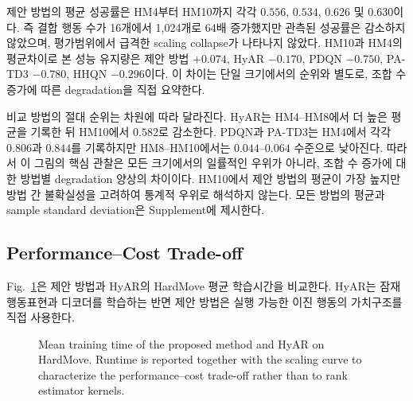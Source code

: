 \documentclass[10pt,journal]{IEEEtran}
\begin{document}
제안 방법의 평균 성공률은 HM4부터 HM10까지 각각
$0.556$, $0.534$, $0.626$ 및 $0.630$이다. 즉 결합 행동 수가 16개에서 1,024개로 64배 증가했지만 관측된 성공률은 감소하지 않았으며, 평가범위에서 급격한 scaling collapse가 나타나지 않았다. HM10과 HM4의 평균차이로 본 성능 유지량은 제안 방법 $+0.074$, HyAR $-0.170$, PDQN $-0.750$, PA-TD3 $-0.780$, HHQN $-0.296$이다. 이 차이는 단일 크기에서의 순위와 별도로, 조합 수 증가에 따른 degradation을 직접 요약한다.

비교 방법의 절대 순위는 차원에 따라 달라진다. HyAR는 HM4--HM8에서 더 높은 평균을 기록한 뒤 HM10에서 $0.582$로 감소한다. PDQN과 PA-TD3는 HM4에서 각각 $0.806$과 $0.844$를 기록하지만 HM8--HM10에서는 $0.044$--$0.064$ 수준으로 낮아진다. 따라서 이 그림의 핵심 관찰은 모든 크기에서의 일률적인 우위가 아니라, 조합 수 증가에 대한 방법별 degradation 양상의 차이이다. HM10에서 제안 방법의 평균이 가장 높지만 방법 간 불확실성을 고려하여 통계적 우위로 해석하지 않는다. 모든 방법의 평균과 sample standard deviation은 Supplement에 제시한다.


\subsection{Performance--Cost Trade-off}

Fig.~\ref{fig:hardmove-runtime}은 제안 방법과 HyAR의 HardMove 평균 학습시간을 비교한다. HyAR는 잠재 행동표현과 디코더를 학습하는 반면 제안 방법은 실행 가능한 이진 행동의 가치구조를 직접 사용한다.

\begin{figure}[t]
\centering
{}
\caption{
Mean training time of the proposed method and HyAR on HardMove.
Runtime is reported together with the scaling curve to characterize
the performance--cost trade-off rather than to rank estimator kernels.
}
\label{fig:hardmove-runtime}
\end{figure}
\end{document}
